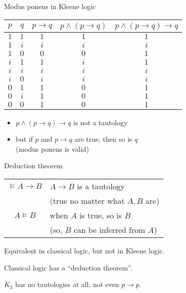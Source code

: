 \documentclass{beamer}
\begin{document}
\begin{frame}{Modus ponens in Kleene logic}

\begin{tabular}{cc|c|c|c}
$p$ & $q$ & $p\to q$ & $p\land(p\to q)$ & $p\land(p\to q)\to q$ \\
\hline
$1$ & $1$ & $1$ & $1$ & $1$ \\
$1$ & $i$ & $i$ & $i$ & $i$ \\
$1$ & $0$ & $0$ & $0$ & $1$ \\
$i$ & $1$ & $1$ & $i$ & $1$ \\
$i$ & $i$ & $i$ & $i$ & $i$ \\
$i$ & $0$ & $i$ & $i$ & $i$ \\
$0$ & $1$ & $1$ & $0$ & $1$ \\
$0$ & $i$ & $1$ & $0$ & $1$ \\
$0$ & $0$ & $1$ & $0$ & $1$
\end{tabular}

\vfill

\begin{itemize}
\item $p\land(p\to q)\to q$ is not a tautology
\item but if $p$ and $p\to q$ are true, then so is $q$\\
    (modus ponens is valid)
\end{itemize}

\end{frame}

\begin{frame}{Deduction theorem}

\begin{tabular}{c|l}
\hline
$\vDash A\to B$ & $A\to B$ is a tautology \\
    & (true no matter what $A,B$ are) \\
\hline
$A\vDash B$ & when $A$ is true, so is $B$ \\
    & (so, $B$ can be inferred from $A$) \\
\hline
\end{tabular}

\vfill

Equivalent in classical logic, but not in Kleene logic.

Classical logic has a ``deduction theorem''.

\vfill

$K_3$ has no tautologies at all, not even $p\to p$.

\vfill

\end{frame}
\end{document}
